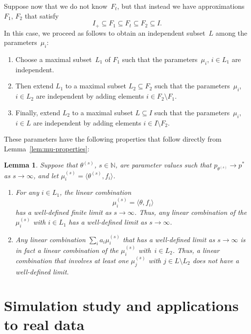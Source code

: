 \documentclass[aos,noinfoline]{imsart}
\def\N{{\mathbb N}}
\def\<{\langle}
\def\>{\rangle}
\newtheorem{lemma}[theorem]{Lemma}
\theoremstyle{remark}
\theoremstyle{definition}
\begin{document}
Suppose now that we do not know~$F_{t}$, but that instead we have  approximations $F_{1}$, $F_{2}$ that satisfy
\begin{equation*}
  I_{+}\subseteq F_{1} \subseteq F_{t} \subseteq F_{2} \subseteq I.
\end{equation*}
In this case, we proceed as follows to obtain an independent subset~$L$ among the parameters~$\mu_{i}$:
\begin{enumerate}
\item Choose a maximal subset~$L_{1}$ of $F_{1}$ such that the parameters~$\mu_{i}$, $i\in L_{1}$ are independent.
\item Then extend $L_{1}$ to a maximal subset $L_{2}\subseteq F_{2}$ such that the parameters~$\mu_{i}$, $i\in L_{2}$
  are independent by adding elements $i\in F_{2}\setminus F_{1}$.
\item Finally, extend $L_{2}$ to a maximal subset $L\subseteq I$ such that the parameters~$\mu_{i}$, $i\in L$ are
  independent by adding elements $i\in I\setminus F_{2}$.
\end{enumerate}
These parameters have the following properties that follow directly from Lemma~\ref{lem:mu-properties}:
\begin{lemma}
  Suppose that $\theta^{(s)}$, $s\in\N$, are parameter values such that $p_{\theta^{(s)}}\to p^{*}$ as $s\to\infty$, and
  let $\mu_{i}^{(s)} = \<\theta^{(s)},f_{i}\>$.
  \begin{enumerate}
  \item For any $i\in L_{1}$, the linear combination
    \begin{equation*}
      \mu_{i}^{(s)} = \<\theta,f_{i}\>
    \end{equation*}
    has a well-defined finite limit as $s\to\infty$.  Thus, any linear combination of the $\mu_{i}^{(s)}$ with $i\in
    L_{1}$ has a well-defined limit as $s\to\infty$.
  \item Any linear combination $\sum_{i}a_{i}\mu_{i}^{(s)}$ that has a well-defined limit as $s\to\infty$ is in fact a
    linear combination of the $\mu_{i}^{(s)}$ with~$i\in L_{2}$.  Thus, a linear combination that involves at
    least one $\mu_{j}^{(s)}$ with $j\in L\setminus L_{2}$ does not have a well-defined limit.
  \end{enumerate}
\end{lemma}

\section{Simulation study and applications to real data}
\label{sec:experiments}
\end{document}
